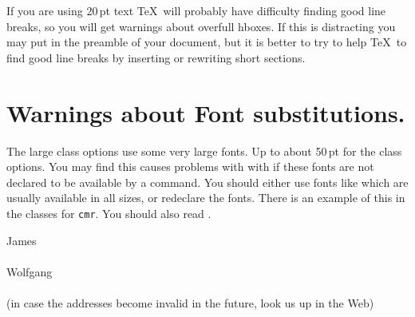 If you are using 20\,pt text \TeX\ will probably have difficulty finding
good line breaks, so you will get warnings about overfull hboxes.  
If this is distracting you may put \cmd{\sloppy} in the preamble of your
document, but it is better to try to help \TeX\ to find good line breaks
by inserting \cmd{\-} or rewriting short sections.


\section{Warnings about Font substitutions.}

The large class options use some very large fonts. Up to about 50\,pt for
the \opt{20pt} class options.  You may find this causes problems with with
if these fonts are not declared to be available by a \cmd{\DeclareFontShape}
command.  You should either use fonts like  which are usually
available in all sizes, or redeclare the fonts.  There is an example of
this in the  classes for \texttt{cmr}.  You should also read .

\bigskip

\begin{flushleft}
James\\
\quad{}\\
Wolfgang\\
\quad{}\\
(in case the addresses become invalid in the future, 
look us up in the Web)
\end{flushleft}














